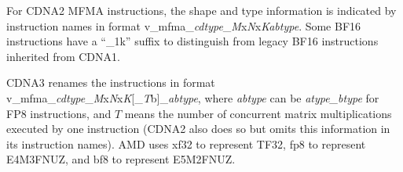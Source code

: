 For CDNA2 MFMA instructions, the shape and type information is indicated by instruction names in format v\_mfma\_\textit{cdtype}\_\textit{M}x\textit{N}x\textit{K}\textit{abtype}. Some BF16 instructions have a ``\_1k'' suffix to distinguish from legacy BF16 instructions inherited from CDNA1.

CDNA3 renames the instructions in format v\_mfma\_\textit{cdtype}\_\textit{M}x\textit{N}x\textit{K}[\_\textit{T}b]\_\textit{abtype}, where \textit{abtype} can be \textit{atype\_btype} for FP8 instructions, and $T$ means the number of concurrent matrix multiplications executed by one instruction (CDNA2 also does so but omits this information in its instruction names). AMD uses xf32 to represent TF32, fp8 to represent E4M3FNUZ, and bf8 to represent E5M2FNUZ.

